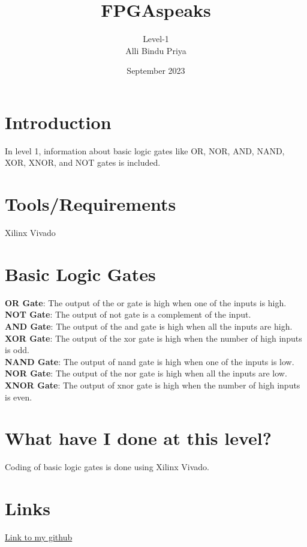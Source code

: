 \documentclass{article}
\title{\textbf{FPGAspeaks}}
\author{Level-1\\Alli Bindu Priya}
\date{September 2023}
\begin{document}
\maketitle
\tableofcontents
\section{Introduction}
In level 1, information about basic logic gates like OR, NOR, AND, NAND, XOR, XNOR, and NOT gates is included.
\section{Tools/Requirements}
Xilinx Vivado
\section{Basic Logic Gates}
\textbf{OR Gate}: The output of the or gate is high when one of the inputs is high.\\
\textbf{NOT Gate}: The output of not gate is a complement of the input.\\
\textbf{AND Gate}: The output of the and gate is high when all the inputs are high.\\
\textbf{XOR Gate}: The output of the xor gate is high  when the number of high inputs is odd.\\
\textbf{NAND Gate}: The output of nand gate is high when one of the inputs is low.\\
\textbf{NOR Gate}: The output of the nor gate is high when all the inputs are low.\\
\textbf{XNOR Gate}: The output of xnor gate is high when the number of high inputs is even.

\section{What have I done at this level?}
Coding of basic logic gates is done using Xilinx Vivado.
\section{Links}
\href{https://github.com/Bindupriya1912/FPGAspeaks/tree/main/Level%201}{Link to my github}
\end{document}
